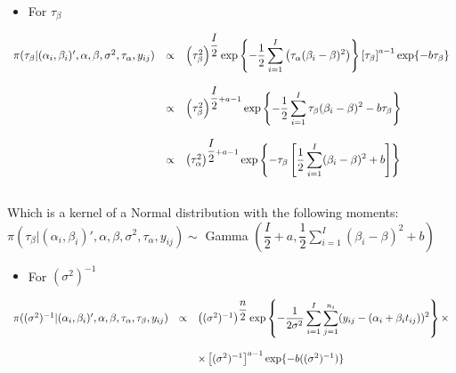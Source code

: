 \documentclass{article}
\begin{document}
\begin{itemize}
\item For $\tau_\beta$
\end{itemize}
\begin{equation*}
\begin{array}{lcl ll }

\pi(\tau_\beta|(\alpha_i, \beta_i)', \alpha, \beta, \sigma^2, \tau_\alpha ,y_{ij}) & \propto & \left(\tau_{\beta}^2\right)^{\dfrac{I}{2}} \mbox{exp}\left\{ - \dfrac{1}{2} 
\displaystyle\sum_{i=1}^{I} \left( \tau_{\alpha}(\beta_{i} - \beta)^2 \right)\right\} \left[\tau_\beta \right]^{a -1} \mbox{exp} \{ - b\tau_\beta\} \\ \\

& \propto & \left(\tau_{\beta}^2\right)^{\dfrac{I}{2} + a -1} \mbox{exp}\left\{ - \dfrac{1}{2}\displaystyle\sum_{i=1}^{I} \tau_{\beta}(\beta_{i} - \beta)^2 - b\tau_{\beta} \right\} \\ \\

& \propto & \left(\tau_{\alpha}^2\right)^{\dfrac{I}{2} + a -1} \mbox{exp}\left\{ - \tau_{\beta}\left[ \dfrac{1}{2}\displaystyle\sum_{i=1}^{I}(\beta_{i} - \beta)^2 + b \right]\right\} \\ \\


 \end{array}
\end{equation*}

Which is a kernel of a Normal distribution with the following moments:\\

$\pi(\tau_\beta |(\alpha_i, \beta_i)', \alpha, \beta, \sigma^2, \tau_\alpha ,y_{ij}) \sim $ Gamma $\left( \dfrac{I}{2} + a , \dfrac{1}{2}\displaystyle\sum_{i=1}^{I}(\beta_{i} - \beta)^2 + b \right)$ \\

\begin{itemize}
\item For $(\sigma^2)^{-1}$
\end{itemize}
\begin{equation*}
\begin{array}{lcl ll }

\pi((\sigma^2)^{-1}|(\alpha_i, \beta_i)', \alpha, \beta, \tau_\alpha, \tau_\beta, y_{ij}) & \propto & \left((\sigma^2)^{-1}\right)^{\dfrac{n}{2}}\mbox{exp}\left\{ - \dfrac{1}{2\sigma^2}\displaystyle\sum_{i=1}^{I}\displaystyle\sum_{j=1}^{n_i}(y_{ij} - (\alpha_i + \beta_i t_{ij}))^2\right\} \times \\ \\

& & \times \left[ (\sigma^2)^{-1} \right]^{a -1} \mbox{exp} \{ - b((\sigma^2)^{-1})\}

 \end{array}
\end{equation*}
\end{document}
